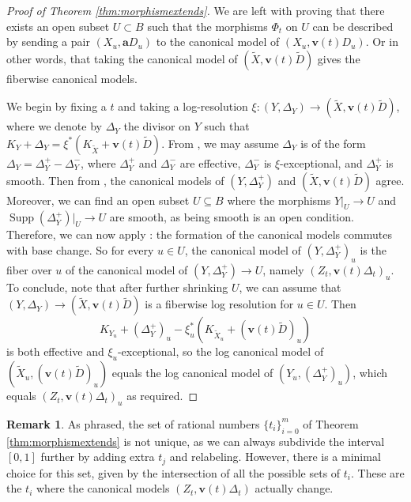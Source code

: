 \documentclass[11pt]{amsart}
\newcommand{\margg}[1]{\normalsize{{\color{red}\footnote{{\color{red}#1}}}{\marginpar[{\color{red}\hfill\tiny\thefootnote$\rightarrow$}]{{\color{red}$\leftarrow$\tiny\thefootnote}}}}}
\newcommand{\DGK}[1]{\margg{(DGK) #1}}
\theoremstyle{definition}
\newtheorem{remark}[theorem]{Remark}
\theoremstyle{remark}
\newtheorem{notation}[theorem]{Notation}
\newcommand{\tildeD}{\widetilde{D}}
\newcommand{\tildeX}{\widetilde{X}}
\newcommand{\Supp}{\operatorname{Supp}}
\newcommand{\bfv}{\mathbf{v}}
\begin{document}
\begin{proof}[Proof of Theorem \ref{thm:morphismextends}]
		We are left with proving that there exists an open subset $U \subset B$ such that the morphisms $\Phi_t$ on $U$ can be described by sending a pair $(X_u, \mathbf{a}D_u)$ to the canonical model of $(X_u, \mathbf{v}(t)D_u)$. Or in other words, that taking the canonical model of $(\tildeX,\bfv(t)\tildeD)$ gives the fiberwise canonical models.
		
		We begin by fixing a $t$ and taking a log-resolution $\xi:(Y,\Delta_Y)\to (\tildeX,\bfv(t)\tildeD)$, where we denote by $\Delta_Y$ the divisor on $Y$ such that $K_Y+\Delta_Y = \xi^*(K_{\tildeX}+\bfv(t)\tildeD)$. From \cite[Proposition 2.36]{KM98}, we may assume $\Delta_Y$ is of the form $\Delta_Y=\Delta_Y^+ - \Delta_Y^-$, where $\Delta_Y^+$ and $\Delta_Y^-$ are effective, $\Delta_Y^-$ is $\xi$-exceptional, and $\Delta_Y^+$ is smooth. Then from \cite[Corollary 3.53]{KM98}, the canonical models of $(Y,\Delta_Y^+)$ and $(\tildeX,\bfv(t)\tildeD)$ agree. Moreover, we can find an open subset $U\subseteq B$ where the morphisms $Y|_U\to U$ and $\Supp(\Delta_Y^+)|_U\to U$ are smooth, as being smooth is an open condition. Therefore, we can now apply \cite[Theorem 4.2]{hacon2013birational}: the formation of the canonical models commutes with base change. So for every $u\in U$, the canonical model of $(Y,\Delta_Y^+)_u$ is the fiber over $u$ of the canonical model of $(Y,\Delta_Y^+)\to U$, namely $(Z_t,\bfv (t)\Delta_t)_u$. To conclude, note that after further shrinking $U$, we can assume that $(Y, \Delta_Y) \to (\tilde{X}, \bfv(t)\tilde{D})$ is a fiberwise log resolution for $u \in U$. Then
		$$
		K_{Y_u} + (\Delta^+_Y)_u - \xi_u^*(K_{\tilde{X}_u} + (\bfv(t)\tilde{D})_u) 
		$$
		is both effective and $\xi_u$-exceptional, so the log canonical model of $(\tilde{X}_u, (\bfv(t)\tilde{D})_u)$ equals the log canonical model of $(Y_u, (\Delta_Y^+)_u)$, which equals $(Z_t, \bfv(t)\Delta_t)_u$ as required.\end{proof}
	
	
	
	
	\begin{remark}\label{remark:unique:walls}
		As phrased, the set of rational numbers $\{t_i\}_{i = 0}^m$ of Theorem \ref{thm:morphismextends} is not unique, as we can always subdivide the interval $[0,1]$ further by adding extra $t_j$ and relabeling. However, there is a minimal choice for this set, given by the intersection of all the possible sets of $t_i$. These are the $t_i$ where the canonical models $(Z_t, \bfv(t)\Delta_t)$ actually change. 
	\end{remark}
	
\end{document}
